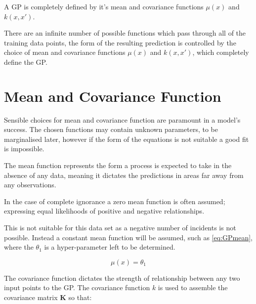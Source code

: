 \documentclass[a4paper,11pt]{report}
\begin{document}
A GP is completely defined by it's mean and covariance functions \(\mu (x)\) and \( k(x,x')\). 

There are an infinite number of possible functions which pass through all of the training data points, the form of the resulting prediction is controlled by the choice of mean and covariance functions \(\mu (x)\) and \( k(x,x')\), which completely define the GP.

\section{Mean and Covariance Function}

Sensible choices for mean and covariance function are paramount in a model's success. The chosen functions may contain unknown parameters, to be marginalised later, however if the form of the equations is not suitable a good fit is impossible. \\ \par

The mean function represents the form a process is expected to take in the absence of any data, meaning it dictates the predictions in areas far away from any observations.

In the case of complete ignorance a zero mean function is often assumed; expressing equal likelihoods of positive and negative relationships. 

This is not suitable for this data set as a negative number of incidents is not possible. Instead a constant mean function will be assumed, such as \ref{eq:GPmean}, where the \(\theta_1\) is a hyper-parameter left to be determined.

\begin{equation} \label{eq:GPmean}
\mu (x) = \theta_1
\end{equation}

\par

The covariance function dictates the strength of relationship between any two input points to the GP. The covariance function \(k\) is used to assemble the covariance matrix \(\mathbf{K}\) so that: 
\end{document}
